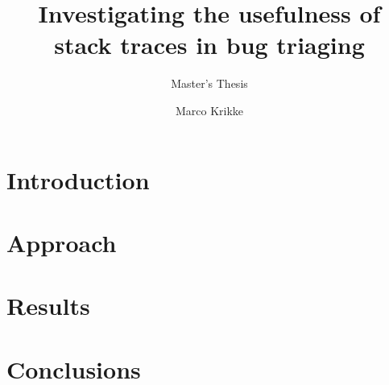 \documentclass[twoside,a4paper,11pt]{memoir}
\title{Investigating the usefulness of stack traces in bug triaging}
\subtitle{Master's Thesis}
\author{Marco Krikke}
\begin{document}
\frontmatter
\thispagestyle{empty}
\maketitle                                      %
\makeformaltitlepages{}         %



\cleardoublepage\tableofcontents
\cleardoublepage\listoffigures
\cleardoublepage\mainmatter

\part{Introduction} %
\label{prt:introduction}
 
 

\part{Approach} %
\label{prt:approach}



\part{Results} %
\label{prt:results}






\part{Conclusions} %
\label{prt:conclusions}

 




\appendix
\def\chaptername{Appendix}


\end{document}
